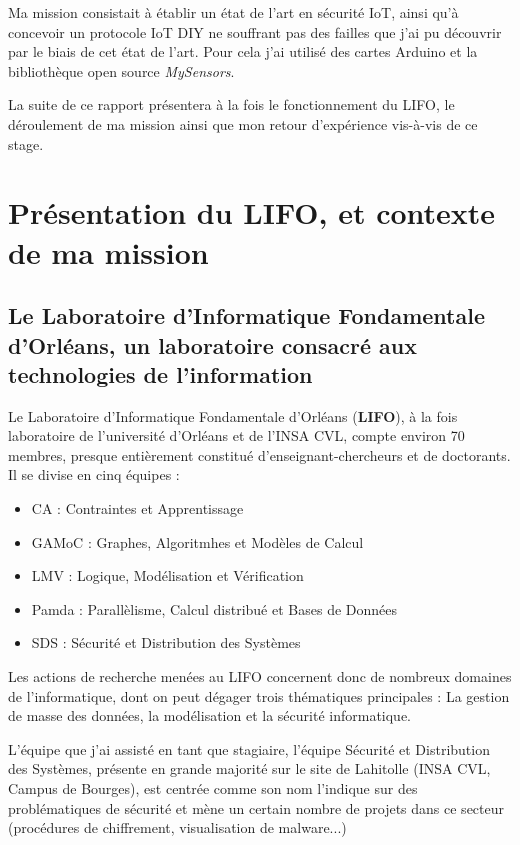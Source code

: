 \documentclass[12 pt]{report}
\begin{document}
Ma mission consistait à établir un état de l'art en sécurité IoT, ainsi qu'à concevoir un protocole IoT DIY ne souffrant pas des failles que j'ai pu découvrir par le biais de cet état de l'art. Pour cela j'ai utilisé des cartes Arduino et la bibliothèque open source \emph{MySensors}.

La suite de ce rapport présentera à la fois le fonctionnement du LIFO, le déroulement de ma mission ainsi que mon retour d'expérience vis-à-vis de ce stage.


\chapter{Présentation du LIFO, et contexte de ma mission}
\section{Le Laboratoire d'Informatique Fondamentale d'Orléans, un laboratoire consacré aux technologies de l'information}
Le Laboratoire d'Informatique Fondamentale d'Orléans (\textbf{LIFO}), à la fois laboratoire de l'université d'Orléans et de l'INSA CVL, compte environ 70 membres, presque entièrement constitué  d'enseignant-chercheurs et de doctorants. Il se divise en cinq équipes :
\begin{itemize}
\item{CA :} Contraintes et Apprentissage
\item{GAMoC :} Graphes, Algoritmhes et Modèles de Calcul
\item{LMV :} Logique, Modélisation et Vérification
\item{Pamda :} Parallèlisme, Calcul distribué et Bases de Données
\item{SDS :} Sécurité et Distribution des Systèmes
\end{itemize}

Les actions de recherche menées au LIFO concernent donc de nombreux domaines de l'informatique, dont on peut dégager trois thématiques principales : La gestion de masse des données, la modélisation et la sécurité informatique.

L'équipe que j'ai assisté en tant que stagiaire, l'équipe Sécurité et Distribution des Systèmes, présente en grande majorité sur le site de Lahitolle (INSA CVL, Campus de Bourges), est centrée comme son nom l'indique sur des problématiques de sécurité et mène un certain nombre de projets dans ce secteur (procédures de chiffrement, visualisation de malware...)
\end{document}
